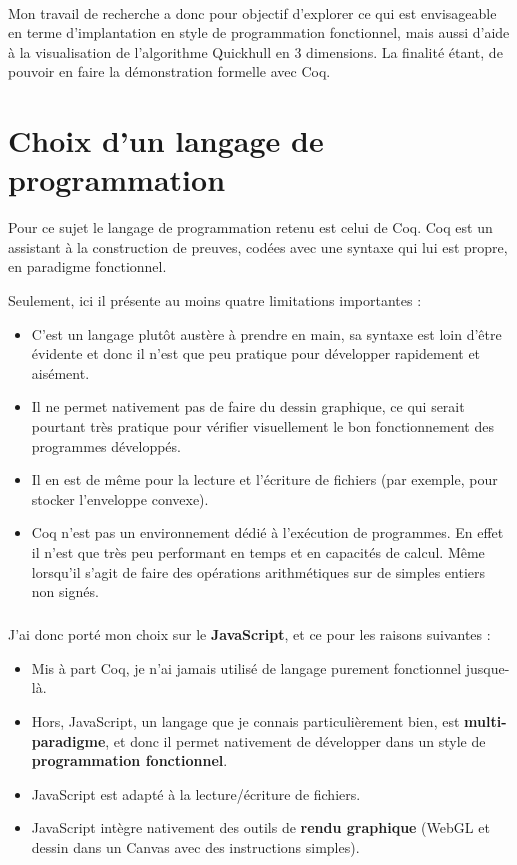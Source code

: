 \documentclass[]{article}
\begin{document}
\paragraph{}
Mon travail de recherche a donc pour objectif d'explorer ce qui est envisageable en terme d'implantation en style de programmation fonctionnel, mais aussi d'aide à la visualisation de l'algorithme Quickhull en 3 dimensions. La finalité étant, de pouvoir en faire la démonstration formelle avec Coq.

\section{Choix d'un langage de programmation}
Pour ce sujet le langage de programmation retenu est celui de Coq. Coq est un assistant à la construction de preuves, codées avec une syntaxe qui lui est propre, en paradigme fonctionnel.

Seulement, ici il présente au moins quatre limitations importantes :
\begin{itemize}
	\item C'est un langage plutôt austère à prendre en main, sa syntaxe est loin d'être évidente et donc il n'est que peu pratique pour développer rapidement et aisément.
	\item Il ne permet nativement pas de faire du dessin graphique, ce qui serait pourtant très pratique pour vérifier visuellement le bon fonctionnement des programmes développés.
	\item Il en est de même pour la lecture et l'écriture de fichiers (par exemple, pour stocker l'enveloppe convexe).
	\item Coq n'est pas un environnement dédié à l'exécution de programmes. En effet il n'est que très peu performant en temps et en capacités de calcul. Même lorsqu'il s'agit de faire des opérations arithmétiques sur de simples entiers non signés.
\end{itemize}

\subparagraph{}
J'ai donc porté mon choix sur le \textbf{JavaScript}, et ce pour les raisons suivantes :
\begin{itemize}
	\item Mis à part Coq, je n'ai jamais utilisé de langage purement fonctionnel jusque-là.
	\item Hors, JavaScript, un langage que je connais particulièrement bien, est \textbf{multi-paradigme}, et donc il permet nativement de développer dans un style de \textbf{programmation fonctionnel}.
	\item JavaScript est adapté à la lecture/écriture de fichiers.
	\item JavaScript intègre nativement des outils de \textbf{rendu graphique} (WebGL et dessin dans un Canvas avec des instructions simples).
\end{itemize}
\end{document}
